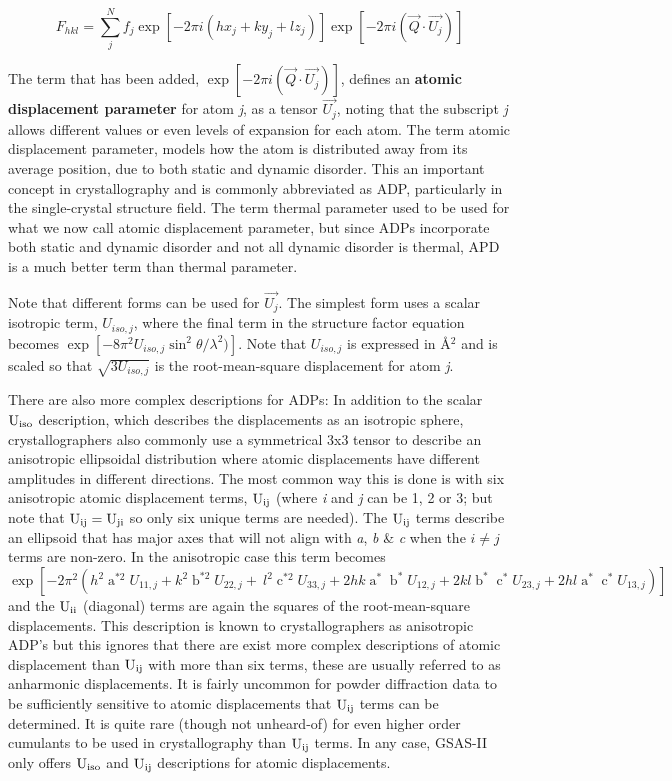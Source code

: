 $$F_{hkl}=\sum_j^N f_j \exp⁡[-2\pi i(hx_j + ky_j + lz_j)] \exp⁡[-2\pi i(\vec{Q}\cdot\vec{U_j})]$$

The term that has been added, $\exp⁡[-2\pi i(\vec{Q}\cdot\vec{U_j})]$, defines an \textbf{atomic displacement parameter} for atom \textit{j}, as a tensor $\vec{U_j}$, noting that the subscript \textit{j} allows different values or even levels of expansion for each atom.
The term atomic displacement parameter, models how the atom is distributed away from its average position, due to both static and dynamic disorder. This an important concept in crystallography and is commonly abbreviated as ADP, particularly in the single-crystal structure field. The term thermal parameter used to be used for what we now call atomic displacement parameter, but since ADPs incorporate both static and dynamic disorder and not all dynamic disorder is thermal, APD is a much better term than thermal parameter.    


Note that different forms can be used for $\vec{U_j}$. The simplest form uses a scalar isotropic term, $U_{iso,j}$, where the final term in the structure factor equation becomes $\exp[-8\pi^2U_{iso,j}\sin^2{\theta}/\lambda^2)]$. Note that $U_{iso,j}$ is expressed in Å${}^2$ and is scaled so that $\sqrt{3 U_{iso,j}}$ is the root-mean-square displacement for atom \textit{j}. 

There are also more complex descriptions for ADPs: In addition to the scalar $\rm U_{iso}$ description, which describes the displacements as an isotropic sphere, crystallographers also commonly use a symmetrical 3x3 tensor to describe an anisotropic ellipsoidal distribution where atomic displacements have different amplitudes in different directions. The most common way this is done is with six anisotropic atomic displacement terms, $\rm U_{ij}$ (where \textit{i} and \textit{j} can be 1, 2 or 3; but note that $\rm U_{ij} = U_{ji}$ so only six unique terms are needed). The $\rm U_{ij}$ terms describe an ellipsoid that has major axes that will not align with \textit{a}, \textit{b} \& \textit{c} when the  $i \neq j$ terms are non-zero. In the anisotropic case this term becomes $\exp[-2\pi^2(h^2\operatorname{a}^{\ast2}U_{11,j}+k^2\operatorname{b}^{\ast2}U_{22,j}+\ l^2\operatorname{c}^{\ast2}U_{33,j}+2hk\operatorname{a}^\ast\operatorname{b}^\ast U_{12,j}+2kl\operatorname{b}^\ast\operatorname{c}^\ast U_{23,j}+2hl\operatorname{a}^\ast\operatorname{c}^\ast U_{13,j})]$ and the $\rm U_{ii}$ (diagonal) terms are again the squares of the root-mean-square displacements. This description is known to crystallographers as anisotropic ADP’s but this ignores that there are exist more complex descriptions of atomic displacement than $\rm U_{ij}$ with more than six terms, these are usually referred to as anharmonic displacements. It is fairly uncommon for powder diffraction data to be sufficiently sensitive to atomic displacements that $\rm U_{ij}$ terms can be determined. It is quite rare (though not unheard-of) for even higher order cumulants to be used in crystallography than $\rm U_{ij}$ terms. In any case, GSAS-II only offers $\rm U_{iso}$ and $\rm U_{ij}$ descriptions for atomic displacements. 

